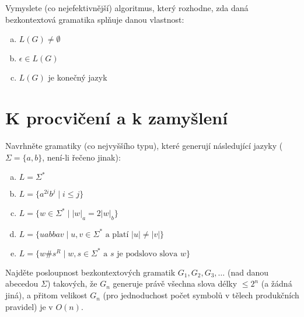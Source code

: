\documentclass[a4paper,12pt]{amsart}
\begin{document}
\begin{problem}

    Vymyslete (co nejefektivnější) algoritmus, který rozhodne, zda daná bezkontextová gramatika splňuje danou vlastnost:
    
    \vspace{-6pt}
    \begin{multicols}{3}
    \begin{enumerate}[(a)]
        \item $L(G)\neq\emptyset$
        \item $\epsilon\in L(G)$
        \item $L(G)$ je konečný jazyk
    \end{enumerate}
    \end{multicols}

\end{problem}


\section*{K procvičení a k zamyšlení}


\medskip\begin{problem}

    Navrhněte gramatiky (co nejvyššího typu), které generují následující jazyky ($\Sigma=\{a,b\}$, není-li řečeno jinak):
    
    \begin{enumerate}[(a)]    
        \item $L=\Sigma^*$        
        \item $L=\{a^{2i}b^j\mid i\leq j\}$
        \item $L=\{w\in\Sigma^*\mid |w|_a = 2|w|_b\}$        
        \item $L=\{uabbav\mid u,v\in\Sigma^*\text{ a platí }|u|\neq|v|\}$ 
        \item $L = \{w \# s^R \mid w,s\in\Sigma^*\text{ a $s$ je podslovo slova $w$}\}$
    \end{enumerate}

\end{problem}


\medskip\begin{problem}
    
    Najděte posloupnost bezkontextových gramatik $G_1,G_2,G_3,\dots$ (nad danou abecedou $\Sigma$) takových, že $G_n$ generuje právě všechna slova délky $\leq 2^n$ (a žádná jiná), a přitom velikost $G_n$ (pro jednoduchost počet symbolů v tělech produkčních pravidel) je v $O(n)$.
    

\end{problem}
\end{document}
